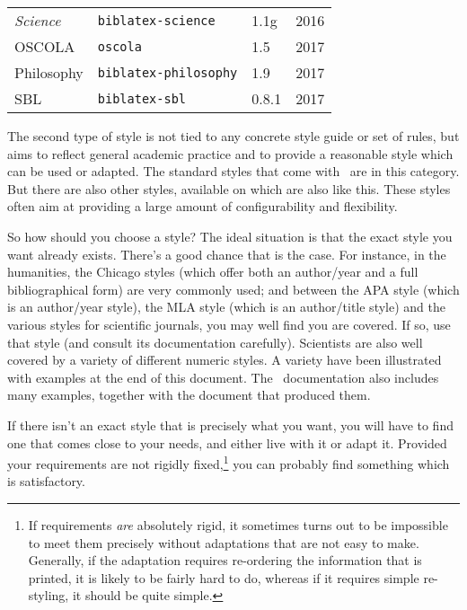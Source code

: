 \begin{table}
\begin{tabular}{llll}
\textit{Science}                 & \texttt{biblatex-science}        & 1.1g             & 2016          \\
OSCOLA                           & \texttt{oscola}                  & 1.5              & 2017          \\
Philosophy                       & \texttt{biblatex-philosophy}     & 1.9              & 2017          \\
SBL                              & \texttt{biblatex-sbl}            & 0.8.1            & 2017          \\  
\bottomrule
\end{tabular}
\end{table}


The second type of style is not tied to any concrete style guide or
set of rules, but aims to reflect general academic practice and to
provide a reasonable style which can be used or
adapted. The standard styles that come with \biblatex\ are in this
category. But there are also other styles, available on
 which are also like this. These styles often aim at
providing a large amount of configurability and
flexibility.

So how should you choose a style? The ideal situation is that the
exact style you want already exists. There's a good chance that is the
case. For instance, in the humanities, the Chicago styles (which offer
both an author/year and a full bibliographical form) are very commonly
used; and between the APA style (which is an author/year style), the
MLA style (which is an author/title style) and the various styles for
scientific journals, you may well find you are covered. If so, use
that style (and consult its documentation carefully). Scientists are
also well covered by a variety of different numeric styles. A variety
have been illustrated with examples at the end of this
document. The \biblatex\
documentation also includes many examples, together with the document
that produced them.

If there isn't an exact style that is precisely what you want, you
will have to find one that comes close to your needs, and either live
with it or adapt it. Provided your requirements are not rigidly
fixed,\footnote[][-3ex]{If requirements \emph{are} absolutely
  rigid, it sometimes turns out to be impossible to meet them
  precisely without adaptations that are not easy to make. Generally,
  if the adaptation requires re-ordering the information that is
  printed, it is likely to be fairly hard to do, whereas if it
  requires simple re-styling, it should be quite simple.} you can
probably find something which is satisfactory.

